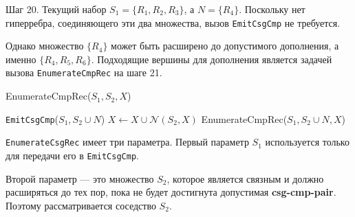 \documentclass[12pt]{article}
\begin{document}
\begin{flushleft}
\begin{center}
\end{center}

Шаг 20.  
Текущий набор $S_1 = \{R_1, R_2, R_3\}$, а $N = \{R_4\}$.  
Поскольку нет гиперребра, соединяющего эти два множества,  
вызов \texttt{EmitCsgCmp} не требуется.  

Однако множество $\{R_4\}$ может быть расширено  
до допустимого дополнения, а именно $\{R_4, R_5, R_6\}$.  
Подходящие вершины для дополнения является задачей вызова  
\texttt{EnumerateCmpRec} на шаге 21.  

\begin{algorithm}
    EnumerateCmpRec($S_1, S_2, X$)
    \begin{algorithmic}[1]
                \State \texttt{EmitCsgCmp}($S_1, S_2 \cup N$)
            \EndIf
        \EndFor
        \State $X \gets X \cup \mathcal{N}(S_2, X)$
            \State EnumerateCmpRec($S_1, S_2 \cup N, X$)
        \EndFor
    \end{algorithmic}
\end{algorithm}

\texttt{EnumerateCsgRec} имеет три параметра.  
Первый параметр $S_1$ используется только для передачи его в \texttt{EmitCsgCmp}.  

Второй параметр — это множество $S_2$,  
которое является связным и должно расширяться до тех пор,  
пока не будет достигнута допустимая \textbf{csg-cmp-pair}.  
Поэтому рассматривается соседство $S_2$.  


\end{flushleft}
\end{document}
